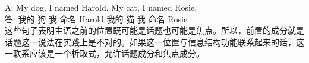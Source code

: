 \gll A: My dog, I named Harold. My cat, I named Rosie.\\
     答: 我的 狗 我 命名 Harold 我的 猫 我 命名 Rosie\\
\z
这些句子表明主语之前的位置既可能是话题也可能是焦点。所以，前置的成分就是话题这一说法在实践上是不对的。如果这一位置与信息结构功能联系起来的话，这一联系应该是一个析取式，允许话题成分和焦点成分。

